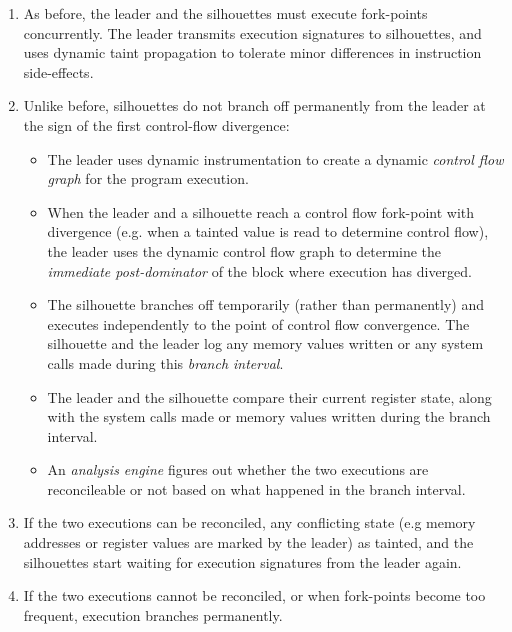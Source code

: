 \begin{enumerate}

\item As before, the leader and the
  silhouettes must execute fork-points concurrently. The leader 
  transmits execution signatures to silhouettes, and uses dynamic taint propagation 
  to tolerate minor differences in instruction side-effects.

\item Unlike before, silhouettes do not branch off permanently
  from the leader at the sign of the first control-flow divergence:

\begin{itemize}
\item The leader uses dynamic instrumentation to
  create a dynamic {\em control flow graph}
  for the program execution.

\item  When the leader and a silhouette reach a
  control flow fork-point with divergence (e.g. when a tainted value
  is read to determine control flow), the
  leader uses the dynamic control flow
  graph to determine the {\em immediate post-dominator}
  of the block where execution has diverged.

\item   The silhouette branches off
  temporarily (rather than permanently)
  and executes independently to the 
  point of control flow convergence.
  The silhouette and the leader log
  any memory values written 
  or any system calls made
  during this {\em branch interval}.

\item 
  The leader and the silhouette
  compare their current register state, along with the system calls made
  or memory values written during the branch interval. 

\item  An {\em analysis engine} figures out
  whether the two executions are reconcileable
  or not based on what happened
  in the branch interval. 
\end{itemize}

\item 
  If the two executions can be reconciled,
  any conflicting state (e.g memory addresses 
  or register values are
  marked by the leader) as tainted,
  and the silhouettes start
  waiting for execution signatures
  from the leader again.

\item 
  If the two executions cannot be reconciled,
  or when fork-points become too frequent,
  execution branches permanently.
\end{enumerate}

